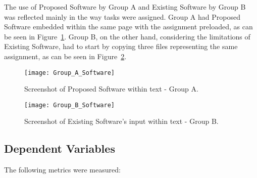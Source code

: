 The use of Proposed Software by Group A and Existing Software by Group B was reflected mainly in the way tasks were assigned.
Group A had Proposed Software embedded within the same page with the assignment preloaded, as can be seen in Figure~\ref{fig:group-a-software}.
Group B, on the other hand, considering the limitations of Existing Software, had to start by copying three files representing the same assignment, as can be seen in Figure~\ref{fig:group-b-software}.

\begin{figure}[ht]
    \centering
    \texttt{[image: Group\_A\_Software]}
    \caption{Screenshot of Proposed Software within text - Group A.}
    \label{fig:group-a-software}
\end{figure}

\begin{figure}[ht]
    \centering
    \texttt{[image: Group\_B\_Software]}
    \caption{Screenshot of Existing Software's input within text - Group B.}
    \label{fig:group-b-software}
\end{figure}

\subsection{Dependent Variables}
\label{sec:methodology-dependent-variables}

The following metrics were measured:

